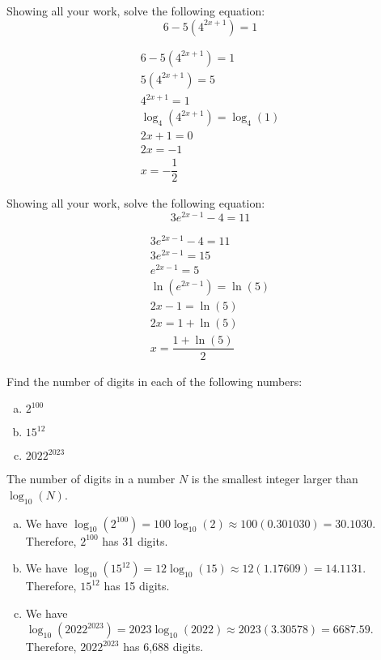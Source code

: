 \documentclass[11pt,letterpaper]{article}
\begin{document}
\newpage



 Showing all your work, solve the following equation:
	\[
	6 - 5(4^{2x + 1})= 1
	\] \pspace

\sol
	\begin{gather*}
	6 - 5(4^{2x + 1})= 1 \\[0.3cm]
	5(4^{2x + 1})= 5 \\[0.3cm]
	4^{2x + 1}= 1 \\[0.3cm]
	\log_4(4^{2x + 1})= \log_4(1) \\[0.3cm]
	2x + 1= 0 \\[0.3cm]
	2x= -1 \\[0.3cm]
	x= -\dfrac{1}{2} 
	\end{gather*}



\newpage



 Showing all your work, solve the following equation:
	\[
	3e^{2x - 1} - 4= 11
	\] \pspace

\sol
	\begin{gather*}
	3e^{2x - 1} - 4= 11 \\[0.3cm]
	3e^{2x - 1}= 15 \\[0.3cm]
	e^{2x - 1}= 5 \\[0.3cm]
	\ln(e^{2x - 1})= \ln(5) \\[0.3cm]
	2x - 1= \ln(5) \\[0.3cm]
	2x= 1 + \ln(5) \\[0.3cm]
	x= \dfrac{1 + \ln(5)}{2}
	\end{gather*}



\newpage



 Find the number of digits in each of the following numbers:
	\begin{enumerate}[(a)]
	\item $2^{100}$
	\item $15^{12}$
	\item $2022^{2023}$
	\end{enumerate} \pspace

\sol The number of digits in a number $N$ is the smallest integer larger than $\log_{10}(N)$. 
\begin{enumerate}[(a)]
\item We have $\log_{10}(2^{100})= 100 \log_{10}(2) \approx 100(0.301030)= 30.1030$. Therefore, $2^{100}$ has 31 digits. \pspace

\item We have $\log_{10}(15^{12})= 12 \log_{10}(15) \approx 12(1.17609)= 14.1131$. Therefore, $15^{12}$ has 15 digits. \pspace
 
\item We have $\log_{10}(2022^{2023})= 2023 \log_{10}(2022) \approx 2023(3.30578)= 6687.59$. Therefore, $2022^{2023}$ has 6,688 digits.  
\end{enumerate}
\end{document}
